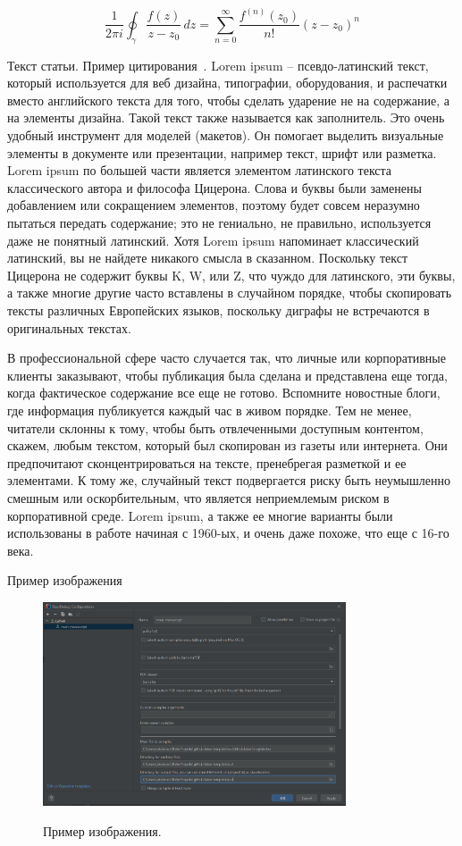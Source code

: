 \begin{equation}
    \frac{1}{2\pi i}\oint_{\gamma} \frac{f(z)}{z-z_0} \,dz = \sum_{n=0}^{\infty} \frac{f^{(n)}(z_0)}{n!}(z-z_0)^n\label{eq:equation}
\end{equation}

Текст статьи.
Пример цитирования~\cite{kolmogorov1950osnovnye, kolmogorov83kobminatorniye, GithubSource_2022, Sloane_theencyclopedia}.
Lorem ipsum – псевдо-латинский текст, который используется для веб дизайна, типографии, оборудования,
и распечатки вместо английского текста для того, чтобы сделать ударение не на содержание,
а на элементы дизайна.
Такой текст также называется как заполнитель.
Это очень удобный инструмент для моделей (макетов).
Он помогает выделить визуальные элементы в документе или презентации, например текст, шрифт или разметка.
Lorem ipsum по большей части является элементом латинского текста классического автора и философа Цицерона.
Слова и буквы были заменены добавлением или сокращением элементов, поэтому будет совсем неразумно пытаться передать содержание;
это не гениально, не правильно, используется даже не понятный латинский.
Хотя Lorem ipsum напоминает классический латинский, вы не найдете никакого смысла в сказанном.
Поскольку текст Цицерона не содержит буквы K, W, или Z, что чуждо для латинского, эти буквы, а также многие другие
часто вставлены в случайном порядке, чтобы скопировать тексты различных Европейских языков, поскольку диграфы
не встречаются в оригинальных текстах.

В профессиональной сфере часто случается так, что личные или корпоративные клиенты заказывают, чтобы публикация была
сделана и представлена еще тогда, когда фактическое содержание все еще не готово.
Вспомните новостные блоги, где информация публикуется каждый час в живом порядке.
Тем не менее, читатели склонны к тому, чтобы быть отвлеченными доступным контентом, скажем, любым текстом, который
был скопирован из газеты или интернета.
Они предпочитают сконцентрироваться на тексте, пренебрегая разметкой и ее элементами.
К тому же, случайный текст подвергается риску быть неумышленно смешным или оскорбительным,
что является неприемлемым риском в корпоративной среде.
Lorem ipsum, а также ее многие варианты были использованы в работе начиная с 1960-ых, и очень даже похоже,
что еще с 16-го века.

Пример изображения
\begin{figure}[H]
    \centering
    \includegraphics[width=0.8\textwidth]{../img/latex_configuration}
    ~\caption{Пример изображения.}\label{fig:figure}
\end{figure}